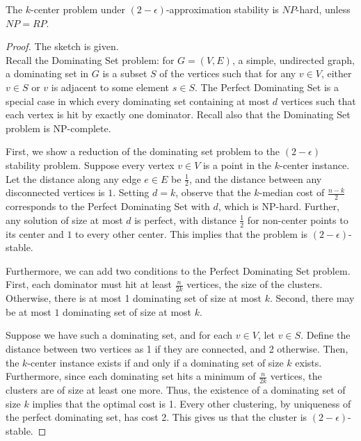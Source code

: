 \begin{theorem}
The $k$-center problem under $(2-\epsilon)$-approximation stability is $NP$-hard, unless $NP=RP$.
\end{theorem}

\begin{proof}
The sketch is given. \cite{bendavid}\\

Recall the Dominating Set problem: for $G=(V,E)$, a simple, undirected graph, a dominating set in $G$ is a subset $S$ of the vertices such that for any $v\in V$, either $v\in S$ or $v$ is adjacent to some element $s\in S$. The Perfect Dominating Set is a special case in which every dominating set containing at most $d$ vertices such that each vertex is hit by exactly one dominator. Recall also that the Dominating Set problem is NP-complete.

First, we show a reduction of the dominating set problem to the $(2-\epsilon)$ stability problem. Suppose every vertex $v\in V$ is a point in the $k$-center instance. Let the distance along any edge $e\in E$ be $\frac12$, and the distance between any disconnected vertices is $1$. Setting $d=k$, observe that the $k$-median cost of $\frac{n-k}{2}$ corresponds to the Perfect Dominating Set with $d$, which is NP-hard. Further, any solution of size at most $d$ is perfect, with distance $\frac12$ for non-center points to its center and $1$ to every other center. This implies that the problem is $(2-\epsilon)$-stable.

Furthermore, we can add two conditions to the Perfect Dominating Set problem. First, each dominator must hit at least $\frac n{2k}$ vertices, the size of the clusters. Otherwise, there is at most 1 dominating set of size at most $k$. Second, there may be at most $1$ dominating set of size at most $k$.

Suppose we have such a dominating set, and for each $v\in V$, let $v\in S$. Define the distance between two vertices as 1 if they are connected, and 2 otherwise. Then, the $k$-center instance exists if and only if a dominating set of size $k$ exists. Furthermore, since each dominating set hits a minimum of $\frac n{2k}$ vertices, the clusters are of size at least one more. Thus, the existence of a dominating set of size $k$ implies that the optimal cost is 1. Every other clustering, by uniqueness of the perfect dominating set, has cost 2. This gives us that the cluster is $(2-\epsilon)$-stable.
\end{proof}
